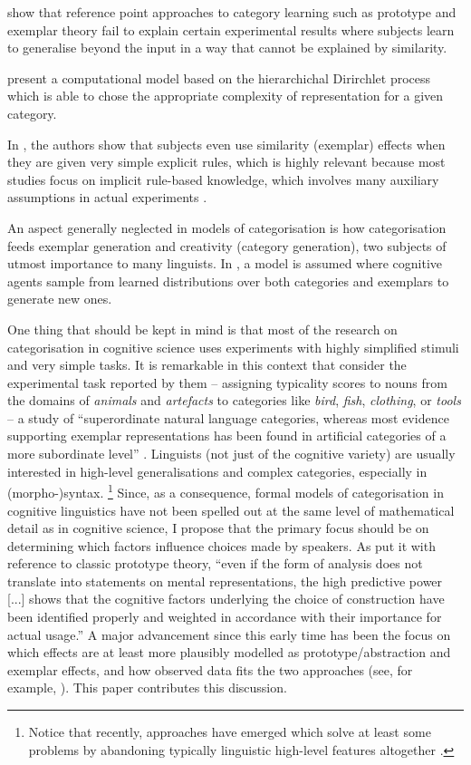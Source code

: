 \cite{ConawayKurtz2016} show that reference point approaches to category learning such as prototype and exemplar theory fail to explain certain experimental results where subjects learn to generalise beyond the input in a way that cannot be explained by similarity.

\cite{GriffithsEa2009} present a computational model based on the hierarchichal Dirirchlet process which is able to chose the appropriate complexity of representation for a given category.

In \cite{HahnEa2010}, the authors show that subjects even use similarity (exemplar) effects when they are given very simple explicit rules, which is highly relevant because most studies focus on implicit rule-based knowledge, which involves many auxiliary assumptions in actual experiments \citep[2]{HahnEa2010}.

An aspect generally neglected in models of categorisation is how categorisation feeds exemplar generation and creativity (\ie category generation), two subjects of utmost importance to many linguists.
In \cite{JernKemp2013}, a model is assumed where cognitive agents sample from learned distributions over both categories and exemplars to generate new ones.

One thing that should be kept in mind is that most of the research on categorisation in cognitive science uses experiments with highly simplified stimuli and very simple tasks.
It is remarkable in this context that \cite{VoorspoelsEa2011} consider the experimental task reported by them -- assigning typicality scores to nouns from the domains of \textit{animals} and \textit{artefacts} to categories like \textit{bird}, \textit{fish}, \textit{clothing}, or \textit{tools} -- a study of ``superordinate natural language categories, whereas most evidence supporting exemplar representations has been found in artificial categories of a more subordinate level'' \citep[1013]{VoorspoelsEa2011}.
Linguists (not just of the cognitive variety) are usually interested in high-level generalisations and complex categories, especially in (morpho-)syntax.%
\footnote{Notice that recently, approaches have emerged which solve at least some problems by abandoning typically linguistic high-level features altogether \citep{BaayenEa2016,RamscarPort2016}.}
Since, as a consequence, formal models of categorisation in cognitive linguistics have not been spelled out at the same level of mathematical detail as in cognitive science, I propose that the primary focus should be on determining which factors influence choices made by speakers.
As \cite[22]{Gries2003} put it with reference to classic prototype theory, ``even if the form of analysis does not translate into statements on mental representations, the high predictive power [...] shows that the cognitive factors underlying the choice of construction have been identified properly and weighted in accordance with their importance for actual usage.''
A major advancement since this early time has been the focus on which effects are at least more plausibly modelled as prototype\slash abstraction and exemplar effects, and how observed data fits the two approaches (see, for example, \citealp{DivjakArppe2013}).
This paper contributes this discussion.




